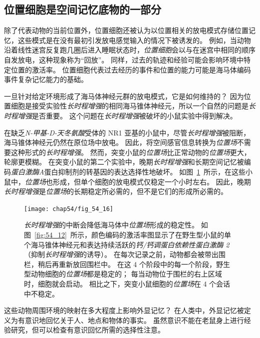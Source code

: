 \subsection{位置细胞是空间记忆底物的一部分}

除了代表动物的当前位置外，位置细胞还被认为以位置相关的放电模式存储位置记忆，这些模式是在没有最初引发放电感觉输入的情况下被诱发的。
例如，当动物沿着线性迷宫反复跑几圈后进入睡眠状态时，\textit{位置细胞}会以与在迷宫中相同的顺序自发放电，这种现象称为“回放”。
同样，过去的轨迹和经验可能会影响环境中特定位置的激活率。
位置细胞代表过去经历的事件和位置的能力可能是海马体编码事件复杂记忆能力的基础。


一旦针对给定环境形成了海马体神经元群的放电模式，它是如何维持的？
因为位置细胞是接受实验性\textit{长时程增强}的相同海马锥体神经元，所以一个自然的问题是\textit{长时程增强}是否重要。
这个问题在\textit{长时程增强}被破坏的小鼠实验中得到解决。


在缺乏\textit{N-甲基-D-天冬氨酸}受体的 NR1 亚基的小鼠中，尽管\textit{长时程增强}被阻断，海马锥体神经元仍然在原位场中放电。
因此，将空间感官信息转换为\textit{位置场}不需要这种形式的\textit{长时程增强}。
然而，突变小鼠的\textit{位置场}比正常动物的\textit{位置场}更大，轮廓更模糊。
在突变小鼠的第二个实验中，晚期\textit{长时程增强}和长期空间记忆被编码\textit{蛋白激酶A}蛋白抑制剂的转基因的表达选择性地破坏。
如图~\ref{fig:54_16}~所示，在这些小鼠中，\textit{位置场}也形成，但单个细胞的放电模式仅稳定一个小时左右。
因此，晚期\textit{长时程增强}是\textit{位置场}的长期稳定所必需的，但不是它们的形成所必需的。


\begin{figure}[htbp]
	\centering
	\texttt{[image: chap54/fig\_54\_16]}
	\caption{\textit{长时程增强}的中断会降低海马体中\textit{位置场}形成的稳定性。
		如图~\ref{fig:54_12}~所示，颜色编码的激活率图显示了在野生型小鼠的单个海马锥体神经元和表达持续活跃的\textit{钙/钙调蛋白依赖性蛋白激酶 2}（抑制\textit{长时程增强}的诱导）。
		在每次记录之前，动物都会被带出围栏，稍后再重新放回围栏中。
		在这 4 个阶段中的每一个阶段，野生型动物细胞的\textit{位置场}都是稳定的；
		每当动物位于围栏的右上区域时，细胞就会启动。
		相比之下，突变小鼠细胞的\textit{位置场}在 4 个会话中不稳定\cite{rotenberg1996mice}。}
	\label{fig:54_16}
\end{figure}


这些动物周围环境的映射在多大程度上影响外显记忆？
在人类中，外显记忆被定义为有意识地回忆关于人、地点和物体的事实。
虽然意识不能在老鼠身上进行经验研究，但可以检查有意识回忆所需的选择性注意。


